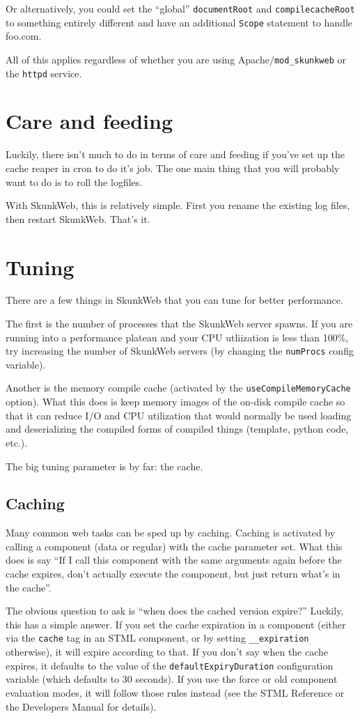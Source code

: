 \documentclass[titlepage]{manual}
\begin{document}
Or alternatively, you could set the ``global'' \texttt{documentRoot}
and \texttt{compilecacheRoot} to something entirely different and have
an additional \texttt{Scope} statement to handle foo.com.

All of this applies regardless of whether you are using
Apache/\texttt{mod\_skunkweb} or the \texttt{httpd} service.

\chapter{Care and feeding}
Luckily, there isn't much to do in terms of care and feeding if you've
set up the cache reaper in cron to do it's job.  The one main thing
that you will probably want to do is to roll the logfiles.

With SkunkWeb, this is relatively simple.  First you rename the existing
log files, then restart SkunkWeb.  That's it.

\chapter{Tuning}
There are a few things in SkunkWeb that you can tune for better
performance.  

The first is the number of processes that the SkunkWeb
server spawns.  If you are running into a performance plateau and your
CPU utliization is less than 100\%, try increasing the number of SkunkWeb
servers (by changing the \texttt{numProcs} config variable).

Another is the memory compile cache (activated by the
\texttt{useCompileMemoryCache} option).  What this does is keep memory
images of the on-disk compile cache so that it can reduce I/O and CPU
utilization that would normally be used loading and deserializing the
compiled forms of compiled things (template, python code, etc.).

The big tuning parameter is by far:  the cache.

\section{Caching}
Many common web tasks can be sped up by caching.  Caching is activated
by calling a component (data or regular) with the cache parameter set.
What this does is say ``If I call this component with the same arguments
again before the cache expires, don't actually execute the component, but
just return what's in the cache''.  

The obvious question to ask is ``when does the cached version
expire?''  Luckily, this has a simple answer.  If you set the cache
expiration in a component (either via the \texttt{cache} tag in an
STML component, or by setting \texttt{__expiration} otherwise), it
will expire according to that.  If you don't say when the cache
expires, it defaults to the value of the
\texttt{defaultExpiryDuration} configuration variable (which defaults
to 30 seconds).  If you use the force or old component evaluation
modes, it will follow those rules instead (see the STML Reference or
the Developers Manual for details).
\end{document}
